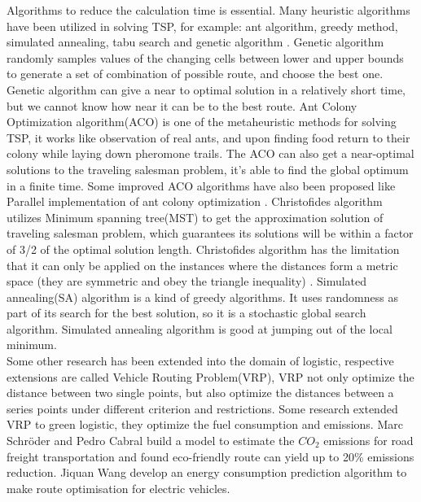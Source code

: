 \documentclass[final-report]{report-template}
\begin{document}
Algorithms to reduce the calculation time is essential. Many heuristic algorithms have been utilized in solving TSP\cite{TSP_review},
for example: ant algorithm, greedy method, simulated annealing, tabu search and genetic algorithm \cite{genetic_on_TSP}. 
Genetic algorithm randomly samples values of the changing cells between lower and upper bounds to generate
a set of combination of possible route, and choose the best one.
Genetic algorithm can give a near to optimal solution in a relatively short time, but we cannot know how near it can be to the best route.
Ant Colony Optimization algorithm(ACO) is one of the metaheuristic methods for solving TSP, 
it works like observation of real ants, and upon finding food return to their colony while laying down pheromone trails\cite{ACO_on_TSP}. 
The ACO can also get a near-optimal solutions to the traveling salesman problem, it's able to find the global optimum in a finite time.
Some improved ACO algorithms have also been proposed like Parallel implementation of ant colony optimization \cite{para_ACO}. 
Christofides algorithm\cite{VANBEVERN2020118} utilizes Minimum spanning tree(MST) to get the approximation solution of traveling salesman problem, 
which guarantees its solutions will be within a factor of 3/2 of the optimal solution length.
Christofides algorithm has the limitation that it can only be applied on the instances where the distances form a metric space (they are symmetric and obey the triangle inequality) \cite{christofides_inbook}.
Simulated annealing(SA) algorithm is a kind of greedy algorithms. It uses randomness as part of its search for the best solution, so it is a stochastic global search algorithm.
Simulated annealing algorithm is good at jumping out of the local minimum\cite{improved_SA}.\\

Some other research has been extended into the domain of logistic, 
respective extensions are called Vehicle Routing Problem(VRP)\cite{BRAEKERS2016300}, 
VRP not only optimize the distance between two single points,
but also optimize the distances between a series points under different criterion and restrictions. 
Some research extended VRP to green logistic, 
they optimize the fuel consumption and emissions\cite{green_vehicle}.
Marc Schröder and Pedro Cabral\cite{article} build a model to estimate the $CO_2$ emissions for road freight transportation and found eco-friendly route can yield up to 20\% emissions reduction.
Jiquan Wang\cite{battery_predict} develop an energy consumption prediction algorithm to make route optimisation for electric vehicles.
\end{document}
